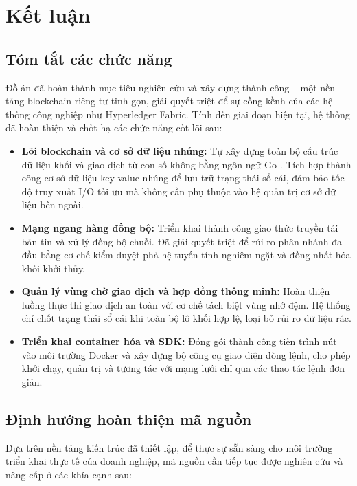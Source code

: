 \documentclass[12pt,a4paper]{article}
\begin{document}
\section*{Kết luận}

\subsection*{Tóm tắt các chức năng }
Đồ án đã hoàn thành mục tiêu nghiên cứu và xây dựng thành công – một nền tảng blockchain riêng tư tinh gọn, giải quyết triệt để sự cồng kềnh của các hệ thống công nghiệp như Hyperledger Fabric. Tính đến giai đoạn hiện tại, hệ thống đã hoàn thiện và chốt hạ các chức năng cốt lõi sau:

\begin{itemize}
    \item \textbf{Lõi blockchain và cơ sở dữ liệu nhúng:} Tự xây dựng toàn bộ cấu trúc dữ liệu khối và giao dịch từ con số không bằng ngôn ngữ Go \cite{donovan}. Tích hợp thành công cơ sở dữ liệu key-value nhúng để lưu trữ trạng thái sổ cái, đảm bảo tốc độ truy xuất I/O tối ưu mà không cần phụ thuộc vào hệ quản trị cơ sở dữ liệu bên ngoài.
    \item \textbf{Mạng ngang hàng đồng bộ:} Triển khai thành công giao thức truyền tải bản tin và xử lý đồng bộ chuỗi. Đã giải quyết triệt để rủi ro phân nhánh đa đầu bằng cơ chế kiểm duyệt phả hệ tuyến tính nghiêm ngặt và đồng nhất hóa khối khởi thủy.
    \item \textbf{Quản lý vùng chờ giao dịch và hợp đồng thông minh:} Hoàn thiện luồng thực thi giao dịch an toàn với cơ chế tách biệt vùng nhớ đệm. Hệ thống chỉ chốt trạng thái sổ cái khi toàn bộ lô khối hợp lệ, loại bỏ rủi ro dữ liệu rác.
    \item \textbf{Triển khai container hóa và SDK:} Đóng gói thành công tiến trình nút vào môi trường Docker và xây dựng bộ công cụ giao diện dòng lệnh, cho phép khởi chạy, quản trị và tương tác với mạng lưới chỉ qua các thao tác lệnh đơn giản.
\end{itemize}

\subsection*{Định hướng hoàn thiện mã nguồn}
Dựa trên nền tảng kiến trúc đã thiết lập, để thực sự sẵn sàng cho môi trường triển khai thực tế của doanh nghiệp, mã nguồn cần tiếp tục được nghiên cứu và nâng cấp ở các khía cạnh sau:
\end{document}
